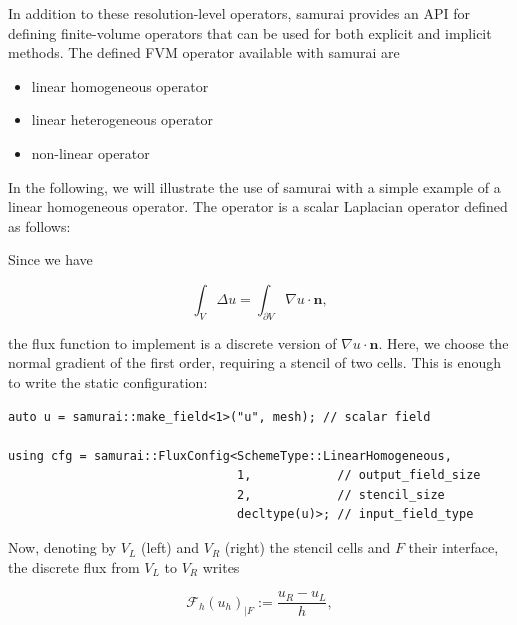 In addition to these resolution-level operators, samurai provides an API for defining finite-volume operators that can be used for both explicit and implicit methods. The defined FVM operator available with samurai are

\begin{itemize}
    \item linear homogeneous operator
    \item linear heterogeneous operator
    \item non-linear operator
\end{itemize}

In the following, we will illustrate the use of samurai with a simple example of a linear homogeneous operator. The operator is a scalar Laplacian operator defined as follows:

Since we have

\begin{equation*}
\int_V \Delta u = \int_{\partial V} \nabla u\cdot \mathbf{n},
\end{equation*}

the flux function to implement is a discrete version of $\nabla u\cdot \mathbf{n}$.
Here, we choose the normal gradient of the first order, requiring a stencil of two cells.
This is enough to write the static configuration:

\begin{listing}[ht]
\begin{verbatim}
auto u = samurai::make_field<1>("u", mesh); // scalar field

using cfg = samurai::FluxConfig<SchemeType::LinearHomogeneous,
                                1,            // output_field_size
                                2,            // stencil_size
                                decltype(u)>; // input_field_type
\end{verbatim}
\end{listing}

Now, denoting by $V_L$ (left) and $V_R$ (right) the stencil cells and $F$ their interface, the discrete flux from $V_L$ to $V_R$ writes

\begin{equation*}
    \mathcal{F}_h(u_h)_{|F} := \frac{u_R-u_L}{h},
\end{equation*}

